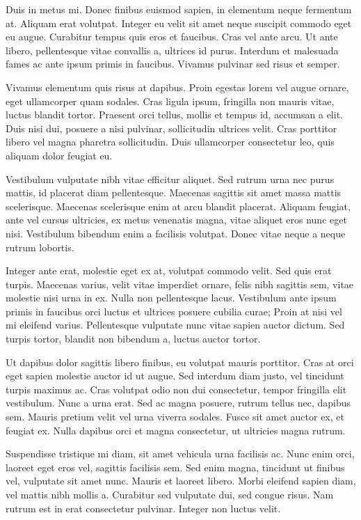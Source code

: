 \documentclass{homework}
\begin{document}
Duis in metus mi. Donec finibus euismod sapien, in elementum neque fermentum at. Aliquam erat volutpat. Integer eu velit sit amet neque suscipit commodo eget eu augue. Curabitur tempus quis eros et faucibus. Cras vel ante arcu. Ut ante libero, pellentesque vitae convallis a, ultrices id purus. Interdum et malesuada fames ac ante ipsum primis in faucibus. Vivamus pulvinar sed risus et semper.

Vivamus elementum quis risus at dapibus. Proin egestas lorem vel augue ornare, eget ullamcorper quam sodales. Cras ligula ipsum, fringilla non mauris vitae, luctus blandit tortor. Praesent orci tellus, mollis et tempus id, accumsan a elit. Duis nisi dui, posuere a nisi pulvinar, sollicitudin ultrices velit. Cras porttitor libero vel magna pharetra sollicitudin. Duis ullamcorper consectetur leo, quis aliquam dolor feugiat eu.

Vestibulum vulputate nibh vitae efficitur aliquet. Sed rutrum urna nec purus mattis, id placerat diam pellentesque. Maecenas sagittis sit amet massa mattis scelerisque. Maecenas scelerisque enim at arcu blandit placerat. Aliquam feugiat, ante vel cursus ultricies, ex metus venenatis magna, vitae aliquet eros nunc eget nisi. Vestibulum bibendum enim a facilisis volutpat. Donec vitae neque a neque rutrum lobortis.

Integer ante erat, molestie eget ex at, volutpat commodo velit. Sed quis erat turpis. Maecenas varius, velit vitae imperdiet ornare, felis nibh sagittis sem, vitae molestie nisi urna in ex. Nulla non pellentesque lacus. Vestibulum ante ipsum primis in faucibus orci luctus et ultrices posuere cubilia curae; Proin at nisi vel mi eleifend varius. Pellentesque vulputate nunc vitae sapien auctor dictum. Sed turpis tortor, blandit non bibendum a, luctus auctor tortor.

Ut dapibus dolor sagittis libero finibus, eu volutpat mauris porttitor. Cras at orci eget sapien molestie auctor id ut augue. Sed interdum diam justo, vel tincidunt turpis maximus ac. Cras volutpat odio non dui consectetur, tempor fringilla elit vestibulum. Nunc a urna erat. Sed ac magna posuere, rutrum tellus nec, dapibus sem. Mauris pretium velit vel urna viverra sodales. Fusce sit amet auctor ex, et feugiat ex. Nulla dapibus orci et magna consectetur, ut ultricies magna rutrum.

Suspendisse tristique mi diam, sit amet vehicula urna facilisis ac. Nunc enim orci, laoreet eget eros vel, sagittis facilisis sem. Sed enim magna, tincidunt ut finibus vel, vulputate sit amet nunc. Mauris et laoreet libero. Morbi eleifend sapien diam, vel mattis nibh mollis a. Curabitur sed vulputate dui, sed congue risus. Nam rutrum est in erat consectetur pulvinar. Integer non luctus velit.
\end{document}
